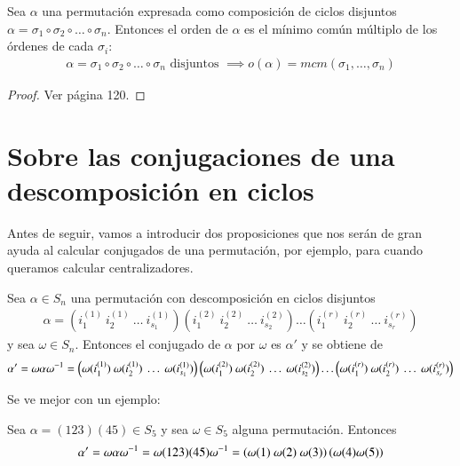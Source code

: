 \begin{thm}
	Sea $\alpha$ una permutación expresada como composición de ciclos disjuntos $\alpha = \sigma_1 \circ \sigma_2 \circ \dots \circ \sigma_n$. Entonces el orden de $\alpha$ es el mínimo común múltiplo de los órdenes de cada $\sigma_i$:
	\begin{align*}
		\alpha = \sigma_1 \circ \sigma_2 \circ \dots \circ \sigma_n \text{ disjuntos } \implies o(\alpha) = mcm(\sigma_1, \dots, \sigma_n)
	\end{align*}
\end{thm}


\begin{proof}
	Ver \cite{dor96} página 120.
\end{proof}

\section{Sobre las conjugaciones de una descomposición en ciclos}

Antes de seguir, vamos a introducir dos proposiciones que nos serán de gran ayuda al calcular conjugados de una permutación, por ejemplo, para cuando queramos calcular centralizadores.

\begin{pro}
	Sea $\alpha \in S_n$ una permutación con descomposición en ciclos disjuntos
	\begin{align*}
	\alpha = \left(i_1^{(1)}\ i_2^{(1)}\ \dots\ i_{s_1}^{(1)}\right)\left(i_1^{(2)}\ i_2^{(2)}\ \dots\ i_{s_2}^{(2)}\right)\dots\left(i_1^{(r)}\ i_2^{(r)}\ \dots\ i_{s_r}^{(r)}\right)
	\end{align*}
	y sea $\omega \in S_n$. Entonces el conjugado de $\alpha$ por $\omega$ es $\alpha'$ y se obtiene de
	\begin{align*}
	\alpha' = \omega \alpha \inv{\omega} = \left(\omega(i_1^{(1)})\ \omega(i_2^{(1)})\ \dots\ \omega(i_{s_1}^{(1)})\right)\left(\omega(i_1^{(2)})\ \omega(i_2^{(2)})\ \dots\ \omega(i_{s_2}^{(2)})\right)\dots\left(\omega(i_1^{(r)})\ \omega(i_2^{(r)})\ \dots\ \omega(i_{s_r}^{(r)})\right)
	\end{align*}
\end{pro}

Se ve mejor con un ejemplo:

\begin{ej}
	Sea $\alpha = (123)(45) \in S_5$ y sea $\omega \in S_5$ alguna permutación. Entonces
	\begin{align*}
	\alpha' = \omega\alpha\omega^{-1} = \omega(123)(45)\omega^{-1}= \left(\omega(1)\ \omega(2)\ \omega(3)\right)\left(\omega(4) \omega(5)\right)
	\end{align*}
\end{ej}

